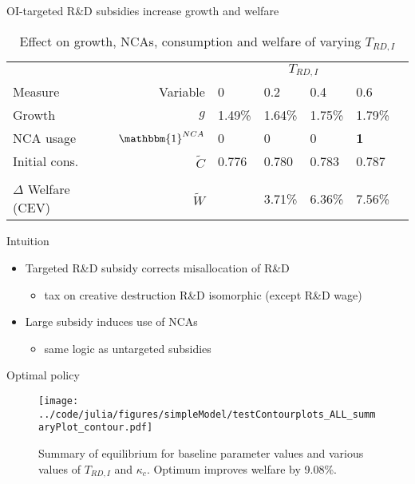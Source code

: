 \documentclass[english,usenames,dvipsnames]{beamer}
\begin{document}
\begin{frame}{OI-targeted R\&D subsidies increase growth and welfare}\label{OI_RDsubsidy_table}
	\begin{table}
		\centering
		\caption*{Effect on growth, NCAs, consumption and welfare of varying $T_{RD,I}$}
		\scriptsize
		\begin{tabular}{lrlllll}
			\toprule \toprule
			 &  & \multicolumn{4}{c}{$T_{RD,I}$} \tabularnewline
			Measure &Variable & 0 & 0.2 & 0.4 & 0.6 \tabularnewline
			\midrule
			Growth & $g$ & 1.49\% & 1.64\% & 1.75\% & 1.79\% \tabularnewline
			NCA usage & $\mathbbm{1}^{NCA}$ & 0 & 0 & 0 & \alert{\textbf{1}} \tabularnewline
			Initial cons. & $\tilde{C}$  & 0.776 &  0.780 & 0.783 & 0.787 \tabularnewline 
			\tabularnewline
			$\Delta$ Welfare (CEV) & $\tilde{W}$  &  & 3.71\% & 6.36\% & 7.56\% \tabularnewline
			\bottomrule
		\end{tabular}
	\end{table}
	\hyperlink{plots:oi_rd_subsidies}{}
\end{frame}

\begin{frame}{Intuition}
	\begin{itemize}
		\item <+-> Targeted R\&D subsidy corrects misallocation of R\&D
		\begin{itemize}
			\item tax on creative destruction R\&D isomorphic (except R\&D wage)
		\end{itemize}
		\smallskip
		\item <+-> Large subsidy induces use of NCAs
		\begin{itemize}
			\item same logic as untargeted subsidies
		\end{itemize}
	\end{itemize}
\end{frame}


\begin{frame}{Optimal policy} \label{plots:all_policies} 
	\begin{figure}[]
		\texttt{[image: ../code/julia/figures/simpleModel/testContourplots\_ALL\_summaryPlot\_contour.pdf]}
		\caption{Summary of equilibrium for baseline parameter values and various values of $T_{RD,I}$ and $\kappa_c$. Optimum improves welfare by 9.08\%.}
		\label{calibration_ALL_summaryPlot}
	\end{figure}
\end{frame}
\end{document}
